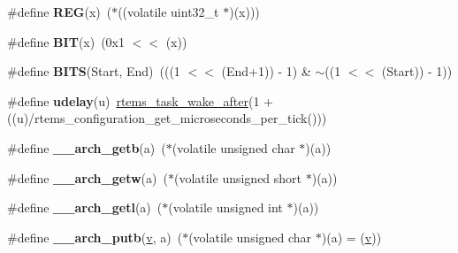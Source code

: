 \begin{DoxyCompactItemize}
\item 
\mbox{\label{group__RTEMSBSPsARMBeagle_gacee196421e9a06f7700bb3064b13b37a}} 
\#define {\bfseries R\+EG}(x)~($\ast$((volatile uint32\+\_\+t $\ast$)(x)))
\item 
\mbox{\label{group__RTEMSBSPsARMBeagle_gad27cc17b25bb93134368d5eb21126eae}} 
\#define {\bfseries B\+IT}(x)~(0x1 $<$$<$ (x))
\item 
\mbox{\label{group__RTEMSBSPsARMBeagle_gab69c584e5505afe7879100f23f8670de}} 
\#define {\bfseries B\+I\+TS}(Start,  End)~(((1 $<$$<$ (End+1)) -\/ 1) \& $\sim$((1 $<$$<$ (Start)) -\/ 1))
\item 
\mbox{\label{group__RTEMSBSPsARMBeagle_gacca2c15322346683dd05d0b2b5954c1b}} 
\#define {\bfseries udelay}(u)~\mbox{\hyperlink{group__ClassicTasks_ga69becc1811a7654b0b74836272ac6429}{rtems\+\_\+task\+\_\+wake\+\_\+after}}(1 + ((u)/rtems\+\_\+configuration\+\_\+get\+\_\+microseconds\+\_\+per\+\_\+tick()))
\item 
\mbox{\label{group__RTEMSBSPsARMBeagle_ga0ed0575deb56506d20d3c073c27d53ba}} 
\#define {\bfseries \+\_\+\+\_\+arch\+\_\+getb}(a)~($\ast$(volatile unsigned char $\ast$)(a))
\item 
\mbox{\label{group__RTEMSBSPsARMBeagle_ga4d280f342fca156aec5224e62681129b}} 
\#define {\bfseries \+\_\+\+\_\+arch\+\_\+getw}(a)~($\ast$(volatile unsigned short $\ast$)(a))
\item 
\mbox{\label{group__RTEMSBSPsARMBeagle_gaf145d22026f82dc0a5301bbd6050a19b}} 
\#define {\bfseries \+\_\+\+\_\+arch\+\_\+getl}(a)~($\ast$(volatile unsigned int $\ast$)(a))
\item 
\mbox{\label{group__RTEMSBSPsARMBeagle_gaf49f4348d0ad7448847b2c484086cf24}} 
\#define {\bfseries \+\_\+\+\_\+arch\+\_\+putb}(\mbox{\hyperlink{sun4u_2tte_8h_a0b943bd7a9fc74d6635879a38dc16894}{v}},  a)~($\ast$(volatile unsigned char $\ast$)(a) = (\mbox{\hyperlink{sun4u_2tte_8h_a0b943bd7a9fc74d6635879a38dc16894}{v}}))
\item 
$$
\end{DoxyCompactItemize}
